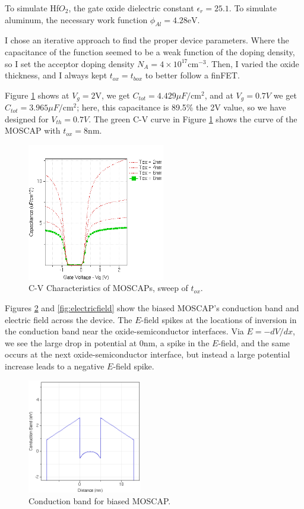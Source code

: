 \documentclass{IEEEtran}
\begin{document}
To simulate Hf\(O_2\), the gate oxide dielectric constant \(\epsilon_r = 25.1\). To simulate aluminum, the necessary work function \(\phi_{Al} = 4.28\text{eV}\). 

I chose an iterative approach to find the proper device parameters. Where the capacitance of the function seemed to be a weak function of the doping density, so I set the acceptor doping density \(N_A = 4 \times 10^{17} \text{cm}^{-3}\). Then, I varied the oxide thickness, and I always kept \(t_{ox} = t_{box}\) to better follow a finFET. 

Figure \ref{fig:cv} shows at \(V_g = 2\text{V}\), we get \(C_{tot} = 4.429 \mu F/\text{cm}^2\), and at \(V_g = 0.7V\) we get \(C_{tot} = 3.965 \mu F/\text{cm}^2\); here, this capacitance is 89.5\% the 2V value, so we have designed for \(V_{th} = 0.7V\). The green C-V curve in Figure \ref{fig:cv} shows the curve of the MOSCAP with \(t_{ox} = 8\text{nm}\). 

\begin{figure}[!ht] 
    \centering
    \includegraphics*[width = 6cm]{cvCharacteristics.png}
    \caption{C-V Characteristics of MOSCAPs, sweep of \(t_{ox}\).}
    \label{fig:cv}
\end{figure}    

Figures \ref{fig:conduction} and \ref{fig:electricfield} show the biased MOSCAP's conduction band and electric field across the device. The \(E\)-field spikes at the locations of inversion in the conduction band near the oxide-semiconductor interfaces. Via \(E = -dV/dx\), we see the large drop in potential at 0nm, a spike in the \(E\)-field, and the same occurs at the next oxide-semiconductor interface, but instead a large potential increase leads to a negative \(E\)-field spike. 

\begin{figure}[!ht] 
    \centering
    \includegraphics*[width = 5cm]{ConductionBandBiased.png}
    \caption{Conduction band for biased MOSCAP.}
    \label{fig:conduction}
\end{figure}    
\end{document}
